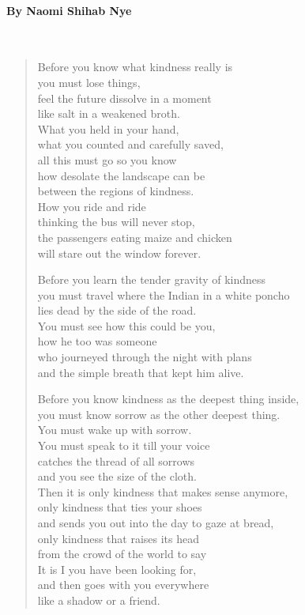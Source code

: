 \paragraph{By Naomi Shihab Nye}~
\begin{verse}
	Before you know what kindness really is\\
	you must lose things,\\
	feel the future dissolve in a moment\\
	like salt in a weakened broth.\\
	What you held in your hand,\\
	what you counted and carefully saved,\\
	all this must go so you know\\
	how desolate the landscape can be\\
	between the regions of kindness.\\
	How you ride and ride\\
	thinking the bus will never stop,\\
	the passengers eating maize and chicken\\
	will stare out the window forever.
	
	Before you learn the tender gravity of kindness\\
	you must travel where the Indian in a white poncho\\
	lies dead by the side of the road.\\
	You must see how this could be you,\\
	how he too was someone\\
	who journeyed through the night with plans\\
	and the simple breath that kept him alive.
	
	Before you know kindness as the deepest thing inside,\\
	you must know sorrow as the other deepest thing.\\
	You must wake up with sorrow.\\
	You must speak to it till your voice\\
	catches the thread of all sorrows\\
	and you see the size of the cloth.\\
	Then it is only kindness that makes sense anymore,\\
	only kindness that ties your shoes\\
	and sends you out into the day to gaze at bread,\\
	only kindness that raises its head\\
	from the crowd of the world to say\\
	It is I you have been looking for,\\
	and then goes with you everywhere\\
	like a shadow or a friend.	
\end{verse}

